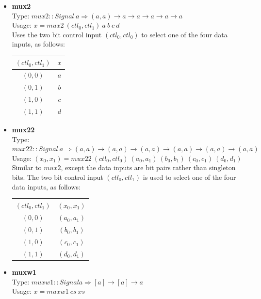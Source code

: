\documentclass[a4paper,openany,fleqn]{book}
\begin{document}
\begin{itemize}
\item \textbf{mux2} \\
  Type: $\mathit{mux2} :: \mathit{Signal}\ a \Rightarrow (a,a)
  \rightarrow a \rightarrow a \rightarrow a \rightarrow a \rightarrow a$ \\
  Usage: $ x = \mathit{mux2}\ (\mathit{ctl}_0,\mathit{ctl}_1)\ a\ b\ c\ d$ \\
  Uses the two bit control input $(\mathit{ctl_0},\mathit{ctl}_0)$ to
  select one of the four data inputs, as follows:
  \begin{center}
    \begin{tabular}[c]{c|c}
      $(\mathit{ctl}_0,\mathit{ctl}_1)$ & $x$ \\
      \hline
      $(0,0)$ & $a$ \\
      $(0,1)$ & $b$ \\
      $(1,0)$ & $c$ \\
      $(1,1)$ & $d$
    \end{tabular}
  \end{center}
\item \textbf{mux22} \\
  Type: $\mathit{mux22} :: \mathit{Signal}\ a \Rightarrow (a,a)
  \rightarrow (a,a) \rightarrow (a,a) \rightarrow (a,a) \rightarrow
  (a,a) \rightarrow (a,a)$ \\
  Usage: $(x_0,x_1) = \mathit{mux22}\ (\mathit{ctl_0},\mathit{ctl}_0)
  \ (a_0,a_1)\ (b_0,b_1)\ (c_0,c_1)\ (d_0,d_1)$ \\
  Similar to $\mathit{mux2}$, except the data inputs are bit pairs
  rather than singleton bits.  The two bit control input
  $(\mathit{ctl_0},\mathit{ctl}_1)$ is used to select one of the four
  data inputs, as follows:
  \begin{center}
    \begin{tabular}[c]{c|c}
      $(\mathit{ctl}_0,\mathit{ctl}_1)$ & $(x_0,x_1)$ \\
      \hline
      $(0,0)$ & $(a_0,a_1)$ \\
      $(0,1)$ & $(b_0,b_1)$ \\
      $(1,0)$ & $(c_0,c_1)$ \\
      $(1,1)$ & $(d_0,d_1)$
    \end{tabular}
  \end{center}
\item \textbf{muxw1} \\
  Type: $\mathit{muxw1} :: \mathit{Signal} a \Rightarrow [a]
  \rightarrow [a] \rightarrow a$ \\
  Usage: $x = \mathit{muxw1}\ \mathit{cs}\ \mathit{xs}$ \\

\end{itemize}
\end{document}
